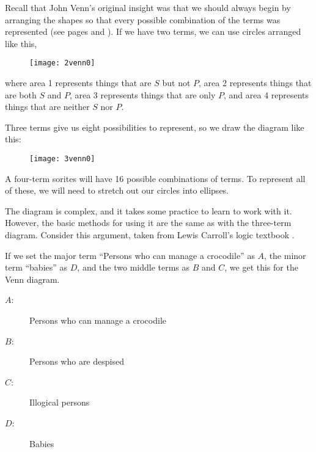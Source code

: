 Recall that John Venn's original insight was that we should always begin by arranging the shapes so that every possible combination of the terms was represented (see pages \pageref{fig:two_circle_venn} and \pageref{fig:three_term_venn_areas}). If we have two terms, we can use circles arranged like this,

\begin{figure}
\centering
\texttt{[image: 2venn0]}
\end{figure}

\noindent where area 1 represents things that are $S$ but not $P$, area 2 represents things that are both  $S$ and $P$, area 3 represents things that are only $P$, and area 4 represents things that are neither $S$ nor $P$.

Three terms give us eight possibilities to represent, so we draw the diagram like this:

\begin{figure}
\centering
\texttt{[image: 3venn0]}
\end{figure}

A four-term sorites will have 16 possible combinations of terms. To represent all of these, we will need to stretch out our circles into ellipses.



The diagram is complex, and it takes some practice to learn to work with it. However, the basic methods for using it are the same as with the three-term diagram. Consider this argument, taken from Lewis Carroll's logic textbook \cite{Dodgson1896}.

\begin{kormanize}
\end{kormanize}

If we set the major term ``Persons who can manage a crocodile'' as $A$, the minor term ``babies'' as $D$, and the two middle terms as $B$ and $C$, we get this for the Venn diagram.

\begin{description}
\item[$A$:] Persons who can manage a crocodile
\item[$B$:] Persons who are despised
\item[$C$:] Illogical persons
\item[$D$:] Babies
\end{description}
